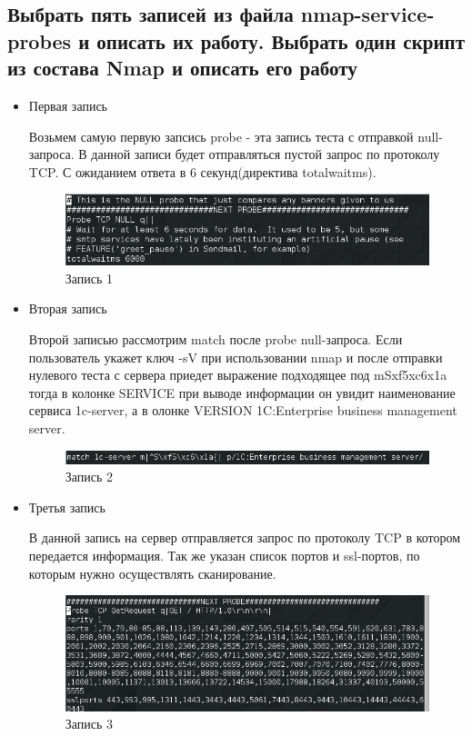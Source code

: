 \documentclass[11pt, a4paper]{article}		%
\begin{document}

\subsection{Выбрать пять записей из файла nmap-service-probes и описать их работу. Выбрать один скрипт из состава Nmap и описать его работу}

\begin{itemize}
\item Первая запись

Возьмем самую первую запсись probe - эта запись теста с отправкой null-запроса. В данной записи будет отправляться пустой запрос по протоколу TCP. С ожиданием ответа в 6 секунд(директива totalwaitms).

\begin{figure}[h!]
\centering
\includegraphics[scale=0.8]{res/11}
\caption{Запись 1}
\end{figure}

\item Вторая запись

Второй записью рассмотрим match после probe null-запроса. Если пользователь укажет ключ -sV при использовании nmap и после отправки нулевого теста с сервера приедет выражение подходящее под mSxf5xc6x1a тогда в колонке SERVICE при выводе информации он увидит наименование сервиса 1c-server, а в олонке VERSION 1C:Enterprise business management server.

\begin{figure}[h!]
\centering
\includegraphics[scale=0.8]{res/12}
\caption{Запись 2}
\end{figure}

\item Третья запись

В данной запись на сервер отправляется запрос по протоколу TCP в котором передается информация. Так же указан список портов и ssl-портов, по которым нужно осуществлять сканирование.

\begin{figure}[h!]
\centering
\includegraphics[scale=0.8]{res/13}
\caption{Запись 3}
\end{figure}


\end{itemize}
\end{document}
